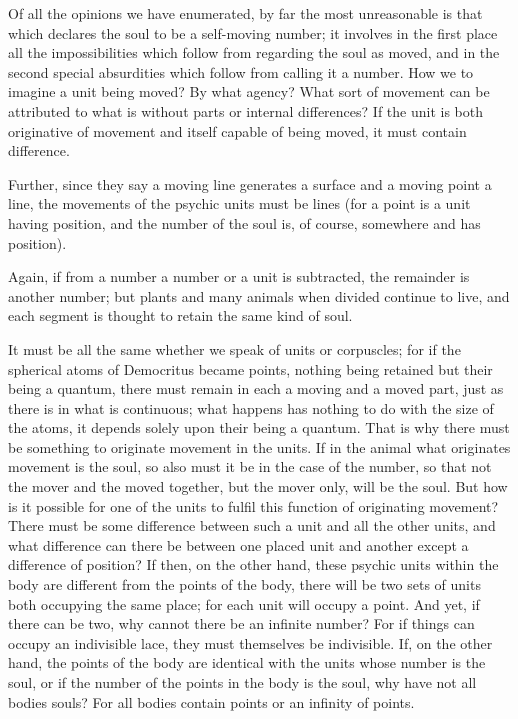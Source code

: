 Of all the opinions we have enumerated, by far the most unreasonable
is that which declares the soul to be a self-moving number; it involves
in the first place all the impossibilities which follow from regarding
the soul as moved, and in the second special absurdities which follow
from calling it a number. How we to imagine a unit being moved? By
what agency? What sort of movement can be attributed to what is without
parts or internal differences? If the unit is both originative of
movement and itself capable of being moved, it must contain difference.

Further, since they say a moving line generates a surface and a moving
point a line, the movements of the psychic units must be lines (for
a point is a unit having position, and the number of the soul is,
of course, somewhere and has position). 

Again, if from a number a number or a unit is subtracted, the remainder
is another number; but plants and many animals when divided continue
to live, and each segment is thought to retain the same kind of soul.

It must be all the same whether we speak of units or corpuscles; for
if the spherical atoms of Democritus became points, nothing being
retained but their being a quantum, there must remain in each a moving
and a moved part, just as there is in what is continuous; what happens
has nothing to do with the size of the atoms, it depends solely upon
their being a quantum. That is why there must be something to originate
movement in the units. If in the animal what originates movement is
the soul, so also must it be in the case of the number, so that not
the mover and the moved together, but the mover only, will be the
soul. But how is it possible for one of the units to fulfil this function
of originating movement? There must be some difference between such
a unit and all the other units, and what difference can there be between
one placed unit and another except a difference of position? If then,
on the other hand, these psychic units within the body are different
from the points of the body, there will be two sets of units both
occupying the same place; for each unit will occupy a point. And yet,
if there can be two, why cannot there be an infinite number? For if
things can occupy an indivisible lace, they must themselves be indivisible.
If, on the other hand, the points of the body are identical with the
units whose number is the soul, or if the number of the points in
the body is the soul, why have not all bodies souls? For all bodies
contain points or an infinity of points. 

